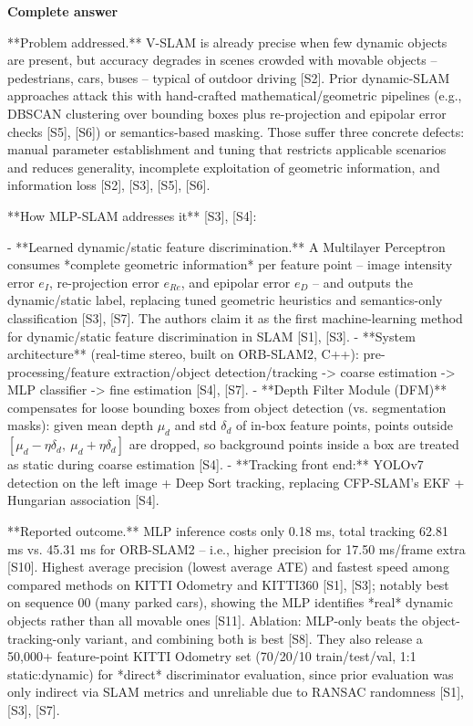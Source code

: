 \documentclass[10pt]{article}
\begin{document}
\textbf{Complete answer}
\begin{AnswerText}
**Problem addressed.** V-SLAM is already precise when few dynamic objects are present, but accuracy degrades in scenes crowded with movable objects -- pedestrians, cars, buses -- typical of outdoor driving [S2]. Prior dynamic-SLAM approaches attack this with hand-crafted mathematical/geometric pipelines (e.g., DBSCAN clustering over bounding boxes plus re-projection and epipolar error checks [S5], [S6]) or semantics-based masking. Those suffer three concrete defects: manual parameter establishment and tuning that restricts applicable scenarios and reduces generality, incomplete exploitation of geometric information, and information loss [S2], [S3], [S5], [S6].

**How MLP-SLAM addresses it** [S3], [S4]:

- **Learned dynamic/static feature discrimination.** A Multilayer Perceptron consumes *complete geometric information* per feature point -- image intensity error $e_I$, re-projection error $e_{Re}$, and epipolar error $e_D$ -- and outputs the dynamic/static label, replacing tuned geometric heuristics and semantics-only classification [S3], [S7]. The authors claim it as the first machine-learning method for dynamic/static feature discrimination in SLAM [S1], [S3].
- **System architecture** (real-time stereo, built on ORB-SLAM2, C++): pre-processing/feature extraction/object detection/tracking -> coarse estimation -> MLP classifier -> fine estimation [S4], [S7].
- **Depth Filter Module (DFM)** compensates for loose bounding boxes from object detection (vs. segmentation masks): given mean depth $\mu_d$ and std $\delta_d$ of in-box feature points, points outside $[\mu_d-\eta\delta_d,\ \mu_d+\eta\delta_d]$ are dropped, so background points inside a box are treated as static during coarse estimation [S4].
- **Tracking front end:** YOLOv7 detection on the left image + Deep Sort tracking, replacing CFP-SLAM's EKF + Hungarian association [S4].

**Reported outcome.** MLP inference costs only 0.18 ms, total tracking 62.81 ms vs. 45.31 ms for ORB-SLAM2 -- i.e., higher precision for 17.50 ms/frame extra [S10]. Highest average precision (lowest average ATE) and fastest speed among compared methods on KITTI Odometry and KITTI360 [S1], [S3]; notably best on sequence 00 (many parked cars), showing the MLP identifies *real* dynamic objects rather than all movable ones [S11]. Ablation: MLP-only beats the object-tracking-only variant, and combining both is best [S8]. They also release a 50,000+ feature-point KITTI Odometry set (70/20/10 train/test/val, 1:1 static:dynamic) for *direct* discriminator evaluation, since prior evaluation was only indirect via SLAM metrics and unreliable due to RANSAC randomness [S1], [S3], [S7].
\end{AnswerText}
\end{document}
